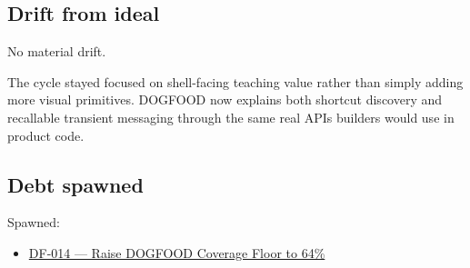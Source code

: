 \subsection{Drift from ideal}\label{record-075-drift-from-ideal}

No material drift.

The cycle stayed focused on shell-facing teaching value rather than simply adding more visual primitives. DOGFOOD now explains both shortcut discovery and recallable transient messaging through the same real APIs builders would use in product code.

\subsection{Debt spawned}\label{record-075-debt-spawned}

Spawned:

\begin{itemize}
\tightlist
\item
  \href{https://github.com/flyingrobots/bijou/blob/cbd70612140e7a450d764b3c7be1c6af878b99bc/docs/design/DF-014-raise-dogfood-coverage-floor-to-64-percent.md}{DF-014 --- Raise DOGFOOD Coverage Floor to 64\%}
\end{itemize}

